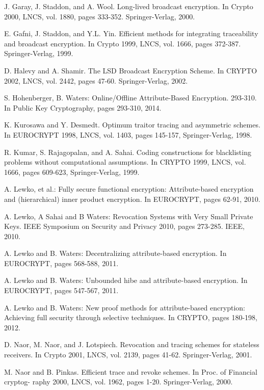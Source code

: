 \documentclass[11pt]{article}
\begin{document}
\begin{thebibliography}{4}
 J. Garay, J. Staddon, and A. Wool. Long-lived broadcast encryption. In  Crypto
2000,  LNCS, vol. 1880,  pages 333-352. Springer-Verlag, 2000.

 E. Gafni, J. Staddon, and Y.L. Yin. Efficient methods for integrating traceability and
broadcast encryption. In  Crypto 1999,  LNCS, vol. 1666, pages 372-387.
Springer-Verlag, 1999.

 D. Halevy and A. Shamir. The LSD Broadcast Encryption Scheme. In   CRYPTO 2002, LNCS, vol. 2442,  pages 47-60. Springer-Verlag, 2002.

 S. Hohenberger, B. Waters: Online/Offline Attribute-Based Encryption. 293-310. In Public Key Cryptography, pages 293-310, 2014.

 K. Kurosawa and Y. Desmedt. Optimum traitor tracing and asymmetric schemes. In
EUROCRYPT 1998, LNCS, vol.  1403,  pages 145-157,  Springer-Verlag, 1998.

 R. Kumar, S. Rajagopalan, and A. Sahai. Coding constructions for blacklisting
problems without computational assumptions. In CRYPTO 1999,  LNCS, vol. 1666, pages 609-623, Springer-Verlag, 1999.

 A. Lewko, et al.: Fully
secure functional encryption: Attribute-based encryption and (hierarchical) inner product encryption.
In EUROCRYPT, pages 62-91, 2010.

 A. Lewko, A Sahai and B Waters: Revocation Systems with Very Small Private Keys. IEEE Symposium on Security and Privacy 2010, pages 273-285. IEEE, 2010.

 A. Lewko and B. Waters: Decentralizing attribute-based encryption. In EUROCRYPT,
pages 568-588, 2011.

 A. Lewko and B. Waters: Unbounded hibe and attribute-based encryption. In EUROCRYPT,
pages 547-567, 2011.

 A. Lewko and B. Waters: New proof methods for attribute-based encryption: Achieving full
security through selective techniques. In CRYPTO, pages 180-198, 2012.


 D. Naor, M. Naor, and J. Lotspiech. Revocation and tracing schemes for stateless receivers.
In Crypto 2001, LNCS,  vol. 2139,  pages 41-62. Springer-Verlag, 2001.

 M. Naor and B. Pinkas. Efficient trace and revoke schemes. In Proc. of Financial cryptog-
raphy 2000, LNCS, vol. 1962,  pages 1-20. Springer-Verlag, 2000.


\end{thebibliography}
\end{document}
